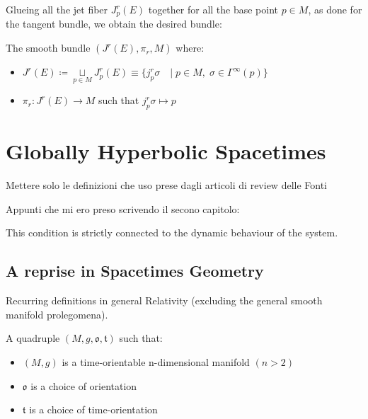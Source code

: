 \documentclass[Main]{subfiles}
\begin{document}
			Glueing all the jet fiber $J^r_p (E)$ together for all the base point $p\in M$, as done for the tangent bundle,  
			we obtain the desired bundle:
			\begin{definition}
				The smooth bundle $(J^r(E), \pi_r, M)$	where:
				\begin{itemize}
					\item $J^r(E) \coloneqq \underset{p \in M}{\sqcup} J^r_p (E)
						 \equiv \big\{j^r_p\sigma \quad \vert \; p\in M, \; \sigma \in \Gamma^\infty(p) \big\}$
					\item $\pi_r: J^r(E) \rightarrow M$ such that $j^{r}_{p}\sigma \mapsto p $
				\end{itemize}
			\end{definition}

	\section{Globally Hyperbolic Spacetimes}
			\begin{Warning}
				Mettere solo le definizioni che uso prese dagli articoli di review delle Fonti
			\end{Warning}	
			Appunti che mi ero preso scrivendo il secono capitolo:
					
			This condition is strictly connected to the dynamic behaviour of the system.
		\subsection{A reprise in Spacetimes Geometry}	
		Recurring definitions in general Relativity (excluding the general smooth manifold prolegomena).

	\begin{definition}
		A quadruple $(M, g, \mathfrak{o}, \mathfrak{t})$ such that:
		\begin{itemize}
			\item $(M,g)$ is a time-orientable n-dimensional manifold $(n>2)$
			\item $\mathfrak{o}$ is a choice of orientation
			\item $\mathfrak{t}$ is a choice of time-orientation
		\end{itemize}
	\end{definition}
\end{document}
